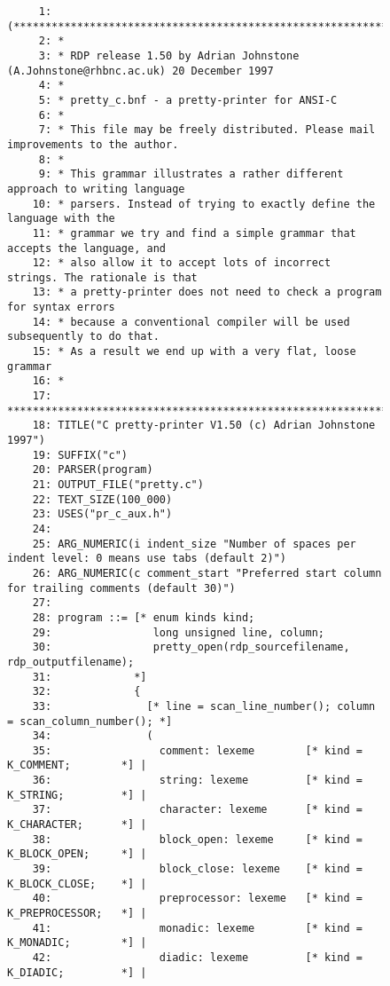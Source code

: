 \begin{figure}
\hspace*{-2cm}
\begin{minipage}{30cm}
\footnotesize
\begin{verbatim}
     1: (*******************************************************************************
     2: *
     3: * RDP release 1.50 by Adrian Johnstone (A.Johnstone@rhbnc.ac.uk) 20 December 1997
     4: *
     5: * pretty_c.bnf - a pretty-printer for ANSI-C
     6: *
     7: * This file may be freely distributed. Please mail improvements to the author.
     8: *
     9: * This grammar illustrates a rather different approach to writing language
    10: * parsers. Instead of trying to exactly define the language with the
    11: * grammar we try and find a simple grammar that accepts the language, and
    12: * also allow it to accept lots of incorrect strings. The rationale is that
    13: * a pretty-printer does not need to check a program for syntax errors
    14: * because a conventional compiler will be used subsequently to do that.
    15: * As a result we end up with a very flat, loose grammar
    16: *
    17: *******************************************************************************)
    18: TITLE("C pretty-printer V1.50 (c) Adrian Johnstone 1997")
    19: SUFFIX("c")
    20: PARSER(program)
    21: OUTPUT_FILE("pretty.c")
    22: TEXT_SIZE(100_000)
    23: USES("pr_c_aux.h")
    24: 
    25: ARG_NUMERIC(i indent_size "Number of spaces per indent level: 0 means use tabs (default 2)")
    26: ARG_NUMERIC(c comment_start "Preferred start column for trailing comments (default 30)")
    27: 
    28: program ::= [* enum kinds kind;
    29:                long unsigned line, column;
    30:                pretty_open(rdp_sourcefilename, rdp_outputfilename);
    31:             *]
    32:             {
    33:               [* line = scan_line_number(); column = scan_column_number(); *]
    34:               (
    35:                 comment: lexeme        [* kind = K_COMMENT;        *] |
    36:                 string: lexeme         [* kind = K_STRING;         *] |
    37:                 character: lexeme      [* kind = K_CHARACTER;      *] |
    38:                 block_open: lexeme     [* kind = K_BLOCK_OPEN;     *] |
    39:                 block_close: lexeme    [* kind = K_BLOCK_CLOSE;    *] |
    40:                 preprocessor: lexeme   [* kind = K_PREPROCESSOR;   *] |
    41:                 monadic: lexeme        [* kind = K_MONADIC;        *] |
    42:                 diadic: lexeme         [* kind = K_DIADIC;         *] |

\end{verbatim}
\end{minipage}
\end{figure}
